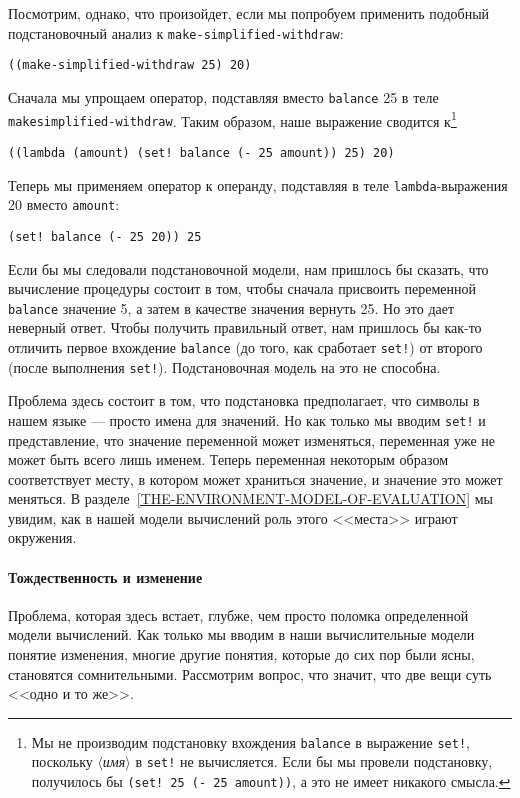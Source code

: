 Посмотрим, однако, что произойдет, если мы попробуем
применить подобный подстановочный анализ к
{\tt make-sim\-pli\-fied-withdraw}:
\sloppy

\begin{Verbatim}[fontsize=\small]
((make-simplified-withdraw 25) 20)
\end{Verbatim}
Сначала мы упрощаем оператор, подставляя вместо {\tt balance}
25 в теле {\tt make\-simplified-withdraw}.  Таким образом, наше
выражение сводится к\footnote{Мы не производим подстановку вхождения
{\tt balance} в выражение {\tt set!}, поскольку
\textit{$\langle$имя$\rangle$} в {\tt set!} не вычисляется.  Если бы мы
провели подстановку, получилось бы {\tt (set! 25 (- 25
amount))}, а это не имеет никакого смысла.}

\begin{Verbatim}[fontsize=\small]
((lambda (amount) (set! balance (- 25 amount)) 25) 20)
\end{Verbatim}
Теперь мы применяем оператор к операнду, подставляя в теле
{\tt lambda}-вы\-ра\-же\-ния 20 вместо {\tt amount}:

\begin{Verbatim}[fontsize=\small]
(set! balance (- 25 20)) 25
\end{Verbatim}
Если бы мы следовали подстановочной модели, нам пришлось бы сказать,
что вычисление процедуры состоит в том, чтобы сначала присвоить
переменной {\tt balance} значение 5, а затем в качестве
значения вернуть 25.  Но это дает неверный ответ.  Чтобы получить
правильный ответ, нам пришлось бы как-то отличить первое вхождение
{\tt balance} (до того, как сработает {\tt set!})
от второго (после выполнения {\tt set!}).
Подстановочная модель на это не способна.

Проблема здесь состоит в том, что подстановка предполагает,
что символы в нашем языке --- просто имена для значений.  Но как только
мы вводим {\tt set!} и представление, что значение переменной
может изменяться, переменная уже не может быть всего лишь именем.
Теперь переменная некоторым образом соответствует месту, в котором
может храниться значение, и значение это может меняться.  В
разделе~\ref{THE-ENVIRONMENT-MODEL-OF-EVALUATION} мы
увидим, как в нашей модели вычислений роль этого <<места>> играют
окружения.

\paragraph{Тождественность и изменение}


Проблема,
которая здесь встает, глубже, чем просто
поломка определенной модели вычислений.  Как только мы вводим в наши
вычислительные модели понятие изменения, многие другие понятия,
которые до сих пор были ясны, становятся сомнительными.  Рассмотрим
вопрос, что значит, что две вещи суть <<одно и то же>>.

